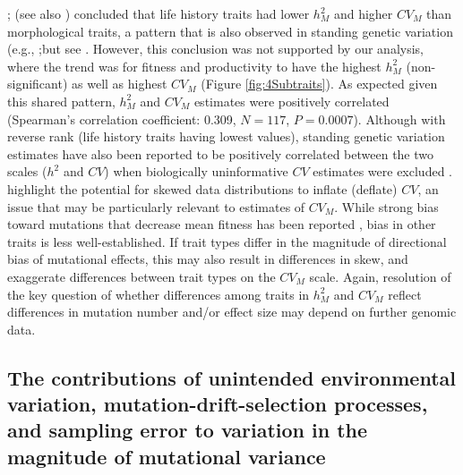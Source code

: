 \citet{Houl96}; (see also \citealp{Lync98c12,Lync99}) concluded that life history traits had lower $h_M^2$ and higher $CV_M$ than morphological traits, a pattern that is also observed in standing genetic variation (e.g., \citealp{Houl92a,Hans11};but see \citealp{Hoff16}. However, this conclusion was not supported by our analysis, where the trend was for fitness and productivity to have the highest $h_M^2$ (non-significant) as well as highest $CV_M$ (Figure \ref{fig:4Subtraits}). As expected given this shared pattern, $h_M^2$ and $CV_M$ estimates were positively correlated (Spearman’s correlation coefficient: 0.309, $N =117$, $P = 0.0007$). Although with reverse rank (life history traits having lowest values), standing genetic variation estimates have also been reported to be positively correlated between the two scales ($h^2$ and $CV$) when biologically uninformative $CV$ estimates were excluded \citep{Hoff16}. \citet{Garc12} highlight the potential for skewed data distributions to inflate (deflate) $CV$, an issue that may be particularly relevant to estimates of $CV_M$. While strong bias toward mutations that decrease mean fitness has been reported \citep{Hall09}, bias in other traits is less well-established. If trait types differ in the magnitude of directional bias of mutational effects, this may also result in differences in skew, and exaggerate differences between trait types on the $CV_M$ scale. Again, resolution of the key question of whether differences among traits in $h_M^2$ and $CV_M$ reflect differences in mutation number and/or effect size may depend on further genomic data.\par 

\subsection{The contributions of unintended environmental variation, mutation-drift-selection processes, and sampling error to variation in the magnitude of mutational variance}

